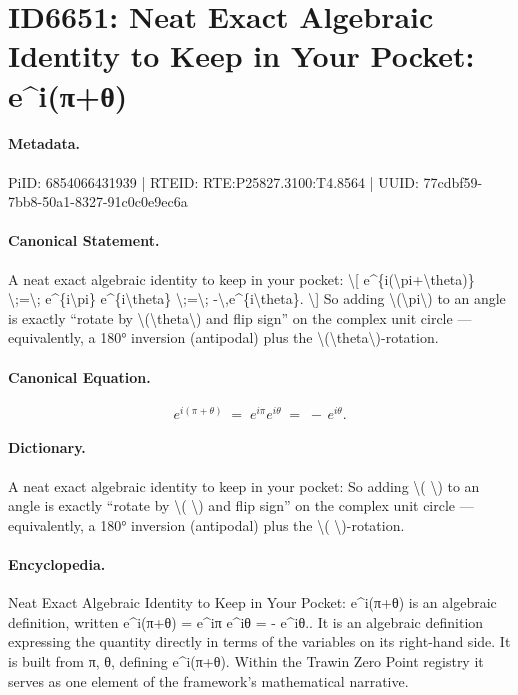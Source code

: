 \section*{ID6651: Neat Exact Algebraic Identity to Keep in Your Pocket: e\textasciicircum{}i(π+θ)}
\paragraph{Metadata.}
PiID: 6854066431939 | RTEID: RTE:P25827.3100:T4.8564 | UUID: 77cdbf59-7bb8-50a1-8327-91c0c0e9ec6a

\paragraph{Canonical Statement.}
A neat exact algebraic identity to keep in your pocket: \textbackslash{}[ e\textasciicircum{}\{i(\textbackslash{}pi+\textbackslash{}theta)\} \textbackslash{};=\textbackslash{}; e\textasciicircum{}\{i\textbackslash{}pi\} e\textasciicircum{}\{i\textbackslash{}theta\} \textbackslash{};=\textbackslash{}; -\textbackslash{},e\textasciicircum{}\{i\textbackslash{}theta\}. \textbackslash{}] So adding \textbackslash{}(\textbackslash{}pi\textbackslash{}) to an angle is exactly “rotate by \textbackslash{}(\textbackslash{}theta\textbackslash{}) and flip sign” on the complex unit circle — equivalently, a 180° inversion (antipodal) plus the \textbackslash{}(\textbackslash{}theta\textbackslash{})-rotation.

\paragraph{Canonical Equation.}
\[
e^{i(\pi+\theta)} \;=\; e^{i\pi} e^{i\theta} \;=\; -\,e^{i\theta}.
\]

\paragraph{Dictionary.}
A neat exact algebraic identity to keep in your pocket: So adding \textbackslash{}( \textbackslash{}) to an angle is exactly “rotate by \textbackslash{}( \textbackslash{}) and flip sign” on the complex unit circle — equivalently, a 180° inversion (antipodal) plus the \textbackslash{}( \textbackslash{})-rotation.

\paragraph{Encyclopedia.}
Neat Exact Algebraic Identity to Keep in Your Pocket: e\textasciicircum{}i(π+θ) is an algebraic definition, written e\textasciicircum{}i(π+θ) = e\textasciicircum{}iπ e\textasciicircum{}iθ = - e\textasciicircum{}iθ.. It is an algebraic definition expressing the quantity directly in terms of the variables on its right-hand side. It is built from π, θ, defining e\textasciicircum{}i(π+θ). Within the Trawin Zero Point registry it serves as one element of the framework's mathematical narrative.

